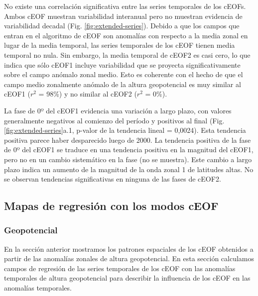 \documentclass[12pt,oneside,a4paper]{reedthesis}
\begin{document}
No existe una correlación significativa entre las series temporales de los cEOFs.
Ambos cEOF muestran variabilidad interanual pero no muestran evidencia de variabilidad decadal (Fig. \ref{fig:extended-series}).
Debido a que los campos que entran en el algoritmo de cEOF son anomalías con respecto a la media zonal en lugar de la media temporal, las series temporales de los cEOF tienen media temporal no nula.
Sin embargo, la media temporal de cEOF2 es casi cero, lo que indica que sólo cEOF1 incluye variabilidad que se proyecta significativamente sobre el campo anómalo zonal medio.
Esto es coherente con el hecho de que el campo medio zonalmente anómalo de la altura geopotencial es muy similar al cEOF1 (\(r^2\) = 98\%) y no similar al cEOF2 (\(r^2\) = 0\%).

La fase de 0º del cEOF1 evidencia una variación a largo plazo, con valores generalmente negativos al comienzo del período y positivos al final (Fig. \ref{fig:extended-series}a.1, p-valor de la tendencia lineal = 0,0024).
Esta tendencia positiva parece haber desparecido luego de 2000.
La tendencia positiva de la fase de 0º del cEOF1 se traduce en una tendencia positiva en la magnitud del cEOF1, pero no en un cambio sistemático en la fase (no se muestra).
Este cambio a largo plazo indica un aumento de la magnitud de la onda zonal 1 de latitudes altas.
No se observan tendencias significativas en ninguna de las fases de cEOF2.

\hypertarget{mapas-de-regresiuxf3n-con-los-modos-ceof}{%
\subsection{Mapas de regresión con los modos cEOF}\label{mapas-de-regresiuxf3n-con-los-modos-ceof}}

\hypertarget{geopotencial}{%
\subsubsection{Geopotencial}\label{geopotencial}}

En la sección anterior mostramos los patrones espaciales de los cEOF obtenidos a partir de las anomalías zonales de altura geopotencial.
En esta sección calculamos campos de regresión de las series temporales de los cEOF con las anomalías temporales de altura geopotencial para describir la influencia de los cEOF en las anomalías temporales.
\end{document}
